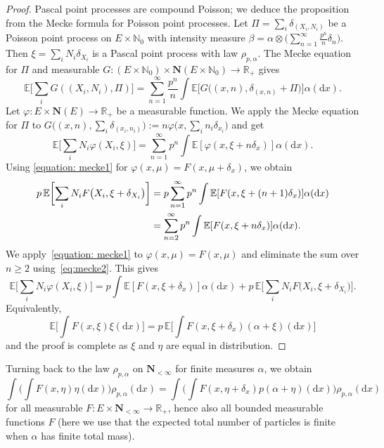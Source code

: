 \documentclass[11pt]{article}
\numberwithin{equation}{section}
\numberwithin{equation}{section}
\newcommand{\N}{\mathbb{N}}
\newcommand{\R}{\mathbb{R}}
\newcommand{\E}{\mathbb{E}}
\newcommand{\dd}{\mathrm{d}} %
\newcommand{\1}{\mathbbm{1}}
\begin{document}
\begin{proof}
	Pascal point processes are compound Poisson; we deduce the proposition from the Mecke formula for Poisson point processes. Let $\Pi = \sum_i \delta_{(X_i,N_i)}$ be a Poisson point process on $E\times \N_0$ with intensity measure $\beta = \alpha\otimes \bigl(\sum_{n=1}^\infty \frac{p^n}{n} \delta_n\bigr)$. Then $\xi = \sum_i N_i \delta_{X_i}$ is a Pascal point process with law $\rho_{p,\alpha}$. The Mecke equation for $\Pi$ \cite[Theorem 4.1]{LastPenroseLecturesOnThePoissonProcess} and measurable $G\colon (E\times \N_0)\times \mathbf N(E\times \N_0) \to \R_+$ gives
\[
	\E\biggl[ \sum_i G( (X_i, N_i), \Pi )\biggr] = \sum_{n=1}^\infty \frac{p^n}{n} \int \E\bigl[ G\bigl( (x,n), \delta_{(x,n)} + \Pi\bigr) \bigr] \alpha (\dd x).
\]
Let $\varphi\colon E\times \mathbf N(E)\to \R_+$ be a measurable function. We apply the Mecke equation for $\Pi$ to $G\bigl((x,n),\sum_i \delta_{(x_i,n_i)}\bigr):= n \varphi\bigl(x, \sum_i n_i \delta_{x_i}\bigr)$ and get
\begin{equation}
 \label{equation: mecke1}
	\E\biggl[\sum_i N_i \varphi( X_i, \xi)\biggr] = \sum_{n=1}^\infty p^n \int \E[ \varphi(x, \xi+ n \delta_x)] \alpha(\dd x).
\end{equation}
Using \eqref{equation: mecke1} for $\varphi(x,\mu) = F(x,\mu + \delta_x)$, we obtain
\begin{align}
 p\, \E \biggl[ \sum_i N_i F\bigl( X_i, \xi +\delta_{X_i}\bigr)\biggr] &= p\sum_{n=1}^\infty p^n \int \E [ F(x, \xi + (n+1) \delta_{x}) ]\alpha(\dd x) \notag \\
 &= \sum_{n=2}^\infty p^n \int \E [ F(x, \xi + n \delta_{x}) ] \alpha(\dd x). \label{eq:mecke2}
\end{align}
We apply~\eqref{equation: mecke1} to $\varphi(x,\mu) = F(x,\mu)$ and eliminate the sum over $n\geq 2$ using~\eqref{eq:mecke2}. This gives
\begin{equation*}
	\E\biggl[\sum_i N_i \varphi( X_i, \xi)\biggr] =
		p \int \E[ F(x, \xi+ \delta_x)] \alpha(\dd x) + p\, \E \biggl[ \sum_i N_i F\bigl( X_i, \xi +\delta_{X_i}\bigr)\biggr].
\end{equation*}
Equivalently,
\[
	\E\biggl[ \int F(x,\xi) \xi(\dd x)\biggr] = p\, \E\biggl[ \int F(x, \xi+\delta_x) (\alpha + \xi)(\dd x)\biggr]
\]
and the proof is complete as $\xi$ and $\eta$ are equal in distribution.
\end{proof}

Turning back to the law $\rho_{p,\alpha}$ on $\mathbf N_{<\infty}$ for finite measures $\alpha$, we obtain
\begin{equation} \label{eq:papangelou}
	\int \biggl( \int F(x,\eta)\eta(\dd x)\biggr) \rho_{p,\alpha}(\dd x)
	= \int\biggl( \int F(x,\eta+\delta_x) p (\alpha+\eta)(\dd x)\biggr) \rho_{p,\alpha}(\dd x)
\end{equation}
for all measurable $F\colon E\times \mathbf N_{<\infty}\to \R_+$, hence also all bounded measurable functions $F$ (here we use that the expected total number of particles is finite when $\alpha$ has finite total mass).
\end{document}
